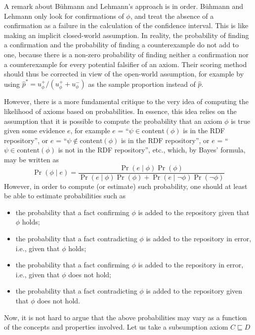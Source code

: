 \documentclass[a4paper]{article}
\newcounter{ex}
\begin{document}
A remark about B\"uhmann and Lehmann's approach is in order.
B\"uhmann and Lehmann only look for confirmations of $\phi$, and treat
the absence of a confirmation as a failure in the calculation of the confidence interval.
This is like making an implicit closed-world assumption. In reality, the probability
of finding a confirmation and the probability of finding a counterexample do not add to one,
because there is a non-zero probability of finding neither a confirmation nor a counterexample
for every potential falsifier of an axiom. Their scoring method should thus be
corrected in view of the open-world assumption, for example by using
$\hat{p}^* = u_\phi^+/(u_\phi^+ + u_\phi^-)$ as the sample proportion instead of $\hat{p}$.

However, there is a more fundamental critique to the very idea of computing the likelihood
of axioms based on probabilities. In essence, this idea relies on the assumption
that it is possible to compute the probability that an axiom $\phi$ is true given
some evidence $e$, for example $e$ = ``$\psi \in \mathrm{content}(\phi)$ is in the RDF repository'',
or $e$ = ``$\psi \notin \mathrm{content}(\phi)$ is in the RDF repository'',
or $e$ = ``$\psi \in \mathrm{content}(\phi)$ is not in the RDF repository'', etc.,
which, by Bayes' formula, may be written as
\begin{equation}
  \Pr(\phi \mid e) =
    \frac{\Pr(e \mid \phi)\Pr(\phi)}{\Pr(e \mid \phi)\Pr(\phi) + \Pr(e \mid \neg\phi)\Pr(\neg\phi)}
\end{equation}
However, in order to compute (or estimate) such probability,
one should at least be able to estimate probabilities such as
\begin{itemize}
\item the probability that a fact confirming $\phi$ is added to the repository
  given that $\phi$ holds;
\item the probability that a fact contradicting $\phi$ is added to the repository
  in error, i.e., given that $\phi$ holds;
\item the probability that a fact confirming $\phi$ is added to the repository
  in error, i.e., given that $\phi$ does not hold;
\item the probability that a fact contradicting $\phi$ is added to the repository
  given that $\phi$ does not hold.
\end{itemize}
Now, it is not hard to argue that the above probabilities may vary as a function of the
concepts and properties involved. Let us take a subsumption axiom $C \sqsubseteq D$
\end{document}
